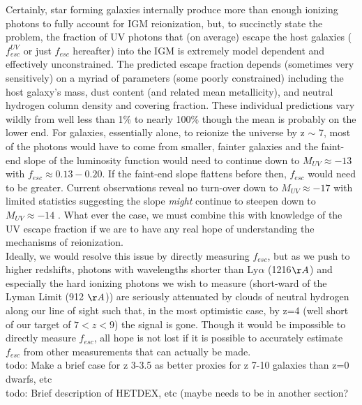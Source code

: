 \documentclass{aastex62}
\begin{document}
Certainly, star forming galaxies internally produce more than enough ionizing photons to fully account for IGM reionization, but, to succinctly state the problem, the fraction of UV photons that (on average) escape the host galaxies ($f^{UV}_{esc}$ or just $f_{esc}$ hereafter) into the IGM is extremely model dependent and effectively unconstrained. The predicted escape fraction depends (sometimes very sensitively) on a myriad of parameters (some poorly constrained) including the host galaxy's mass, dust content (and related mean metallicity), and neutral hydrogen column density and covering fraction. These individual predictions vary wildly from well less than 1\% to nearly 100\% \cite{Zackrisson} though the mean is probably on the lower end. For galaxies, essentially alone, to reionize the universe by z $\sim$ 7, most of the photons would have to come from smaller, fainter galaxies and the faint-end slope of the luminosity function would need to continue down to $M_{UV} \approx -13$ with $f_{esc} \approx 0.13 - 0.20$. If the faint-end slope flattens before then, $f_{esc}$ would need to be greater. Current observations reveal no turn-over down to $M_{UV} \approx -17$ with limited statistics suggesting the slope \textit{might} continue to steepen down to $M_{UV} \approx -14$ \cite{Livermore}. What ever the case, we must combine this with knowledge of the UV escape fraction if we are to have any real hope of understanding the mechanisms of reionization.\\

Ideally, we would resolve this issue by directly measuring $f_{esc}$, but as we push to higher redshifts, photons with wavelengths shorter than Ly$\alpha$ (1216$\AA$) and especially the hard ionizing photons we wish to measure (short-ward of the Lyman Limit (912 $\AA$)) are seriously attenuated by clouds of neutral hydrogen along our line of sight such that, in the most optimistic case, by z=4 (well short of our target of $7 < z < 9$) the signal is gone. Though it would be impossible to directly measure $f_{esc}$, all hope is not lost if it is possible to accurately estimate $f_{esc}$ from other measurements that can actually be made.\\



{ \color{red} todo: Make a brief case for z 3-3.5 as better proxies for z 7-10 galaxies than z=0 dwarfs, etc}\\

{ \color{red} todo: Brief description of HETDEX, etc (maybe needs to be in another section?}\\
\end{document}
